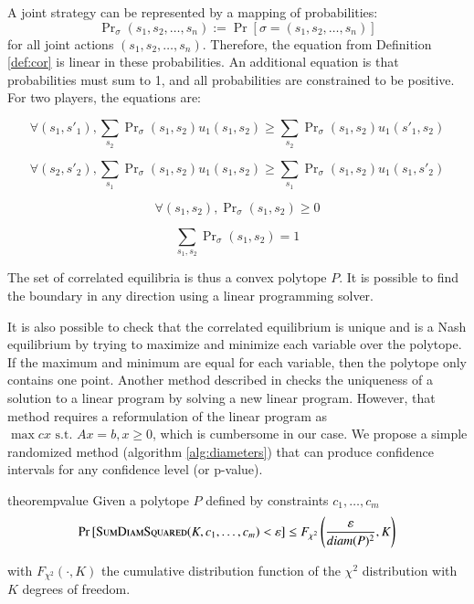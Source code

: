 \documentclass[preprint,12pt,authoryear]{elsarticle}
\theoremstyle{definition}
\begin{document}
A joint strategy can be represented by a mapping of probabilities: $$\Pr\nolimits_\sigma(s_1, s_2, \ldots, s_n) := \Pr[\sigma = (s_1, s_2, \ldots, s_n)]$$ for all joint actions $(s_1, s_2, \ldots, s_n)$. Therefore, the equation from Definition \ref{def:cor} is linear in these probabilities. An additional equation is that probabilities must sum to 1, and all probabilities are constrained to be positive. For two players, the equations are:

$$\forall (s_1, s'_1), \sum_{s_2} \Pr\nolimits_\sigma(s_1, s_2) u_1(s_1, s_2) \ge \sum_{s_2} \Pr\nolimits_\sigma(s_1, s_2) u_1(s'_1, s_2)$$

$$\forall (s_2, s'_2), \sum_{s_1} \Pr\nolimits_\sigma(s_1, s_2) u_1(s_1, s_2) \ge \sum_{s_1} \Pr\nolimits_\sigma(s_1, s_2) u_1(s_1, s'_2)$$

$$\forall (s_1, s_2), \Pr\nolimits_\sigma(s_1, s_2) \ge 0$$

$$\sum_{s_1,s_2} \Pr\nolimits_\sigma(s_1, s_2) = 1$$


The set of correlated equilibria is thus a convex polytope $P$. It is possible to find the boundary in any direction using a linear programming solver.

It is also possible to check that the correlated equilibrium is unique and is a Nash equilibrium by trying to maximize and minimize each variable over the polytope. If the maximum and minimum are equal for each variable, then the polytope only contains one point. Another method described in \citet{appa2002uniqueness} checks the uniqueness of a solution to a linear program by solving a new linear program. However, that method requires a reformulation of the linear program as $\max cx \text{ s.t. } Ax=b, x \ge 0$, which is cumbersome in our case. We propose a simple randomized method (algorithm \ref{alg:diameters}) that can produce confidence intervals for any confidence level (or p-value).

\begin{restatable}{theorem}{pvalue}
\label{thm:pvalue}
Given a polytope $P$ defined by constraints $c_1, \ldots, c_m$
 $$
        \Pr\left[\textsc{SumDiamSquared}(K, c_1, \ldots, c_m) < \varepsilon\right] \le F_{\chi^2}\left(\frac{\varepsilon}{diam(P)^2}, K\right)
   $$

   with $F_{\chi^2}(\cdot, K)$ the cumulative distribution function of the $\chi^2$ distribution with $K$ degrees of freedom.
\end{restatable}
\end{document}
